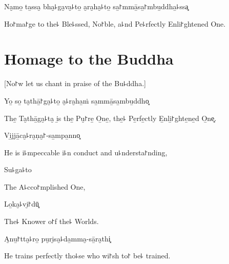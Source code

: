 \vspace{\baselineskip}

Na̮mo̱ ta̱ssa̮ bha̮꜕ga̮va̮꜕to̱ a̮ra̮ha̮꜕to̱ sa̱꜓mmā̱sa̱꜓mbu̱ddha̱꜕ssa͓


\begin{english}
  Ho꜓ma꜓ge to the꜕ Ble꜕ssed, No꜓ble, a꜕nd Pe꜕rfectly Enli꜓ghtened One.

\end{english}

\clearpage

\chapter{Homage to the Buddha}

\begin{leader}
\end{leader}

\begin{english}
  [No꜓w let us chant in praise of the Bu꜕ddha.]
\end{english}

Yo̱ so̱ ta̮thā̱꜓ga̮꜕to̱ a̮꜕ra̮ha̱ṁ sa̱mmā̱sa̱mbu̱ddho͓

\begin{english}
  The̱ Ta̮thā̱ga̮꜕ta̮ i̱s the̱ Pu̮꜓re̱ O̱ne̱, the̱꜕ Pe̱rfe̱ctly E̱nli̱꜓ghte̱ne̱d O̱ne͓.
\end{english}

Vi̱jjā̱ca̮꜕ra̮ṇa̮꜓-sa̱mpa̱nno͓

\begin{english}
  He is i꜕mpeccable i꜕n conduct and u꜕ndersta꜓nding,
\end{english}

Su꜕ga꜕to

\begin{english}
  The A꜕cco꜓mplished One,
\end{english}

Lo̱ka̮꜕vi̮꜓dū͓

\begin{english}
  The꜕ Knower o꜓f the꜕ Worlds.
\end{english}

A̮nu̱꜓tta̮꜕ro̱ pu̮ri̮sa̮꜕da̱mma̮-sā̱ra̮thi͓

\begin{english}
  He trains perfectly tho꜕se who wi꜓sh to꜓ be꜕ trained.
\end{english}

